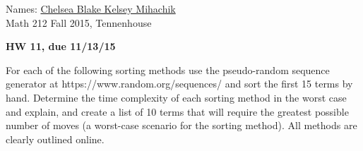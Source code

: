 \documentclass[12pt,letterpaper]{exam}
\begin{document}
\setlength{\pdfpageheight}{\paperheight}
\setlength{\pdfpagewidth}{\paperwidth}

\newcommand{\ud}{\,\mathrm{d}}
\pointsinmargin

Names: \underline{Chelsea Blake Kelsey Mihachik \hspace{4in}}\\
Math 212 Fall 2015, Tennenhouse \\


\begin{center}
\textbf{HW 11, due 11/13/15}\\
\end{center}


For each of the following sorting methods use the pseudo-random sequence generator at https://www.random.org/sequences/ and sort the first 15 terms by hand. Determine the time complexity of each sorting method in the worst case and explain, and create a list of 10 terms that will require the greatest possible number of moves (a worst-case scenario for the sorting method). All methods are clearly outlined online.
\end{document}
